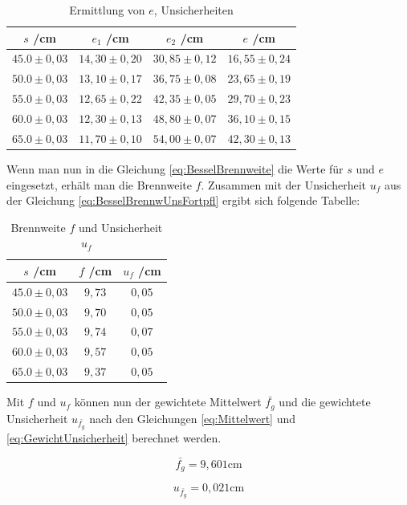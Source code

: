 \documentclass[a4paper,12pt]{article}
\begin{document}
\begin{table}[H]
    \centering
    \begin{tabular}{c|c|c|c}
        $s$ /cm & $e_1$ /cm & $e_2$ /cm & $e$ /cm \\ \hline
        $45.0\pm0,03$ & $14,30\pm0,20$ & $30,85\pm0,12$ & $16,55\pm0,24$ \\
        $50.0\pm0,03$ & $13,10\pm0,17$ & $36,75\pm0,08$ & $23,65\pm0,19$ \\
        $55.0\pm0,03$ & $12,65\pm0,22$ & $42,35\pm0,05$ & $29,70\pm0,23$ \\
        $60.0\pm0,03$ & $12,30\pm0,13$ & $48,80\pm0,07$ & $36,10\pm0,15$ \\
        $65.0\pm0,03$ & $11,70\pm0,10$ & $54,00\pm0,07$ & $42,30\pm0,13$ \\
    \end{tabular}
    \caption{Ermittlung von $e$, Unsicherheiten}
\end{table}

Wenn man nun in die Gleichung \ref{eq:BesselBrennweite} die Werte für $s$ und $e$ eingesetzt, erhält man die Brennweite $f$.
Zusammen mit der Unsicherheit $u_f$ aus der Gleichung \ref{eq:BesselBrennwUnsFortpfl} ergibt sich folgende Tabelle:

\begin{table}[H]
    \centering
    \begin{tabular}{c|c|c}
        $s$ /cm & $f$ /cm & $u_f$ /cm \\ \hline
        $45.0\pm0,03$ & $9,73$ & $0,05$ \\
        $50.0\pm0,03$ & $9,70$ & $0,05$ \\
        $55.0\pm0,03$ & $9,74$ & $0,07$ \\
        $60.0\pm0,03$ & $9,57$ & $0,05$ \\
        $65.0\pm0,03$ & $9,37$ & $0,05$ \\
    \end{tabular}
    \caption{Brennweite $f$ und Unsicherheit $u_f$}
\end{table}

Mit $f$ und $u_f$ können nun der gewichtete Mittelwert $\bar{f_g}$ und die gewichtete Unsicherheit $u_{\bar{f_g}}$
nach den Gleichungen \ref{eq:Mittelwert} und \ref{eq:GewichtUnsicherheit} berechnet werden.

\begin{equation*}
    \bar{f_g} = 9,601\mathrm{cm}
\end{equation*}

\begin{equation*}
    u_{\bar{f_g}} = 0,021\mathrm{cm}
\end{equation*}
\end{document}
